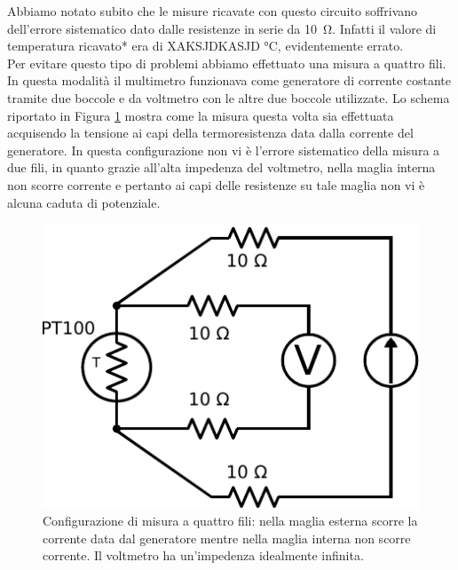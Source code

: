 Abbiamo notato subito che le misure ricavate con questo circuito soffrivano dell'errore sistematico dato dalle resistenze in serie da \SI{10}{\ohm}.
Infatti il valore di temperatura ricavato* era di XAKSJDKASJD \si{\degreeCelsius}, evidentemente errato.\\

Per evitare questo tipo di problemi abbiamo effettuato una misura a quattro fili.
In questa modalità il multimetro funzionava come generatore di corrente costante tramite due boccole e da voltmetro con le altre due boccole utilizzate.
Lo schema riportato in Figura \ref{cir5:4wire} mostra come la misura questa volta sia effettuata acquisendo la tensione ai capi della termoresistenza data dalla corrente del generatore.
In questa configurazione non vi è l'errore sistematico della misura a due fili, in quanto grazie all'alta impedenza del voltmetro, nella maglia interna non scorre corrente e pertanto ai capi delle resistenze su tale maglia non vi è alcuna caduta di potenziale.

\begin{figure}
\centering
\includegraphics[width=.3\textwidth]{../E05/latex/c_PT100_4wire.pdf}
\caption{Configurazione di misura a quattro fili: nella maglia esterna scorre la corrente data dal generatore mentre nella maglia interna non scorre corrente. Il voltmetro ha un'impedenza idealmente infinita.}
\label{cir5:4wire}
\end{figure}

